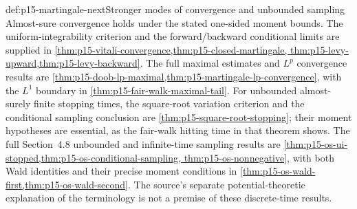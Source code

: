 \begin{proofboundary}{def:p15-martingale-next}{Stronger modes of convergence and unbounded sampling}
Almost-sure convergence holds under the stated one-sided moment bounds.
The uniform-integrability criterion and the forward/backward conditional
limits are supplied in
\cref{thm:p15-vitali-convergence,thm:p15-closed-martingale,
thm:p15-levy-upward,thm:p15-levy-backward}.
The full maximal estimates and \(L^p\) convergence results are
\cref{thm:p15-doob-lp-maximal,thm:p15-martingale-lp-convergence},
with the \(L^1\) boundary in \cref{thm:p15-fair-walk-maximal-tail}.
For unbounded almost-surely finite stopping times, the square-root
variation criterion and the conditional sampling conclusion are
\cref{thm:p15-square-root-stopping}; their moment hypotheses are
essential, as the fair-walk hitting time in that theorem shows.
The full Section~4.8 unbounded and infinite-time sampling results are
\cref{thm:p15-os-ui-stopped,thm:p15-os-conditional-sampling,
thm:p15-os-nonnegative}, with both Wald identities and their precise
moment conditions in \cref{thm:p15-os-wald-first,thm:p15-os-wald-second}.
The source's separate potential-theoretic explanation of the terminology
is not a premise of these discrete-time results.
\end{proofboundary}
